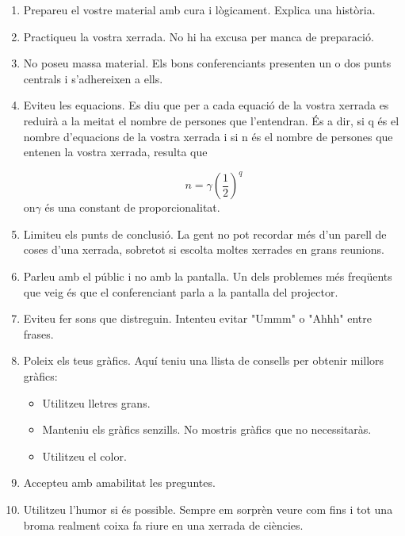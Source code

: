 \documentclass[12pt]{article}
\begin{document}
\begin{enumerate}
\item Prepareu el vostre material amb cura i lògicament. Explica una història.

\item Practiqueu la vostra xerrada. No hi ha excusa per manca de preparació.

\item No poseu massa material. Els bons conferenciants presenten un o dos punts centrals i s'adhereixen a ells.

\item Eviteu les equacions. Es diu que per a cada equació de la vostra xerrada es reduirà a la meitat el nombre de persones que l'entendran. És a dir, si q és el nombre d'equacions de la vostra xerrada i si n és el nombre de persones que entenen la vostra xerrada, resulta que

\begin{equation}
n = \gamma \left( \frac{1}{2} \right)^q
\end{equation}
on$\gamma$ és una constant de proporcionalitat.

\item Limiteu els punts de conclusió. La gent no pot recordar més d'un parell de coses d'una xerrada, sobretot si escolta moltes xerrades en grans reunions.

\item Parleu amb el públic i no amb la pantalla. Un dels problemes més freqüents que veig és que el conferenciant parla a la pantalla del projector.

\item Eviteu fer sons que distreguin. Intenteu evitar "Ummm" o "Ahhh" entre frases.

\item  Poleix els teus gràfics. Aquí teniu una llista de consells per obtenir millors gràfics:

\begin{itemize}
\item Utilitzeu lletres grans.

\item Manteniu els gràfics senzills. No mostris gràfics que no necessitaràs.

\item  Utilitzeu el color.
\end{itemize}

\item Accepteu amb amabilitat les preguntes.

\item  Utilitzeu l'humor si és possible. Sempre em sorprèn  veure com fins i tot una broma realment coixa fa riure en una xerrada de ciències.


\end{enumerate}
\end{document}
